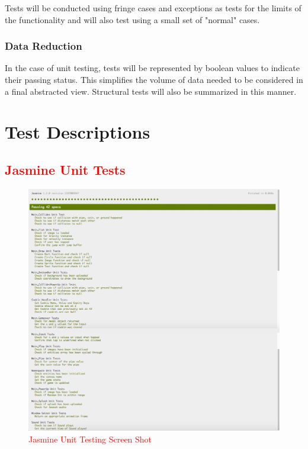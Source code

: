 \documentclass[11pt, oneside]{article}   	%
\begin{document}
Tests will be conducted using fringe cases and exceptions as tests for the limits of the functionality and will also test using a small set of "normal" cases.%

\subsubsection{Data Reduction}
In the case of unit testing, tests will be represented by boolean values to indicate their passing status. This simplifies the volume of data needed to be considered in a final abstracted view. Structural tests will also be summarized in this manner.



\section{Test Descriptions}

\subsection{\textcolor{red}{Jasmine Unit Tests}}
\begin{figure}[H] %
   \centering
   \includegraphics[width=6in]{jasminescreenshot.png} 
   \caption{\textcolor{red}{Jasmine Unit Testing Screen Shot}}
   \label{fig:example}
\end{figure}
\end{document}
